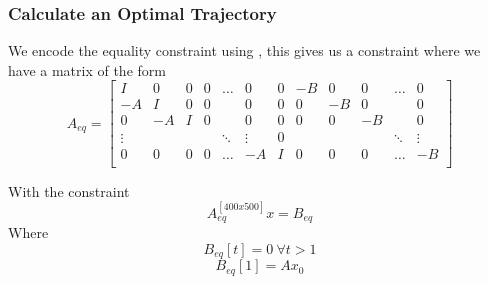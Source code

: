 \subsubsection{Calculate an Optimal Trajectory}
We encode the equality constraint using , this gives us a constraint where we have a matrix of the form
\begin{equation}
A_{eq} =
\begin{bmatrix}
    I      & 0  & 0 & 0 & \hdots & 0      & 0  & -B & 0  & 0  & \hdots & 0\\
    -A     & I  & 0 & 0 &        & 0      & 0  & 0  & -B & 0  &        & 0\\
    0      & -A & I & 0 &        & 0      & 0  & 0  & 0  & -B &        & 0\\
    \vdots &    &   &   & \ddots & \vdots & 0  &    &    &    & \ddots & \vdots\\
    0      & 0  & 0 & 0 & \hdots & -A     & I  & 0  & 0  & 0  & \hdots & -B\\
\end{bmatrix}
\end{equation}

With the constraint
\begin{equation}
{A}_{eq}^{[400x500]} {x} = {B}_{eq}
\end{equation}
Where
\begin{equation}
{B}_{eq}[t] = {0}\ \forall t > 1
\end{equation}
\begin{equation}
{B}_{eq}[1] = Ax_0
\end{equation}

